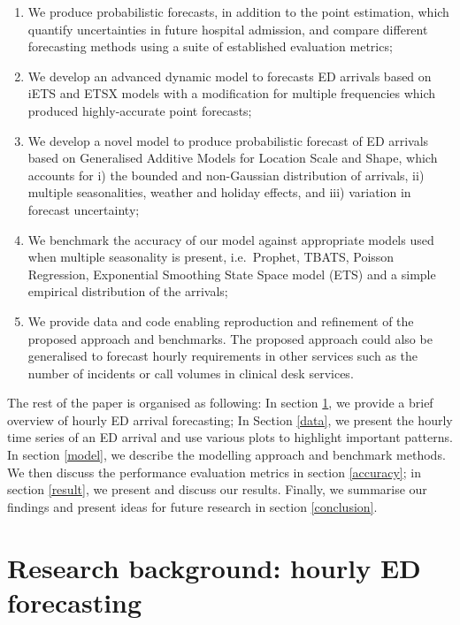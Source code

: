 \documentclass[]{elsarticle} %
\begin{document}
\begin{enumerate}
\def\labelenumi{\arabic{enumi}.}
\item
  We produce probabilistic forecasts, in addition to the point estimation, which quantify uncertainties in future hospital admission, and compare different forecasting methods using a suite of established evaluation metrics;
\item
  We develop an advanced dynamic model to forecasts ED arrivals based on iETS \citep{Svetunkov2019a} and ETSX models with a modification for multiple frequencies which produced highly-accurate point forecasts;
\item
  We develop a novel model to produce probabilistic forecast of ED arrivals based on Generalised Additive Models for Location Scale and Shape, which accounts for i) the bounded and non-Gaussian distribution of arrivals, ii) multiple seasonalities, weather and holiday effects, and iii) variation in forecast uncertainty;
\item
  We benchmark the accuracy of our model against appropriate models used when multiple seasonality is present, i.e.~Prophet, TBATS, Poisson Regression, Exponential Smoothing State Space model (ETS) and a simple empirical distribution of the arrivals;
\item
  We provide data and code enabling reproduction and refinement of the proposed approach and benchmarks. The proposed approach could also be generalised to forecast hourly requirements in other services such as the number of incidents or call volumes in clinical desk services.
\end{enumerate}

The rest of the paper is organised as following: In section \ref{lit}, we provide a brief overview of hourly ED arrival forecasting; In Section \ref{data}, we present the hourly time series of an ED arrival and use various plots to highlight important patterns. In section \ref{model}, we describe the modelling approach and benchmark methods. We then discuss the performance evaluation metrics in section \ref{accuracy}; in section \ref{result}, we present and discuss our results. Finally, we summarise our findings and present ideas for future research in section \ref{conclusion}.

\hypertarget{lit}{%
\section{Research background: hourly ED forecasting}\label{lit}}
\end{document}
